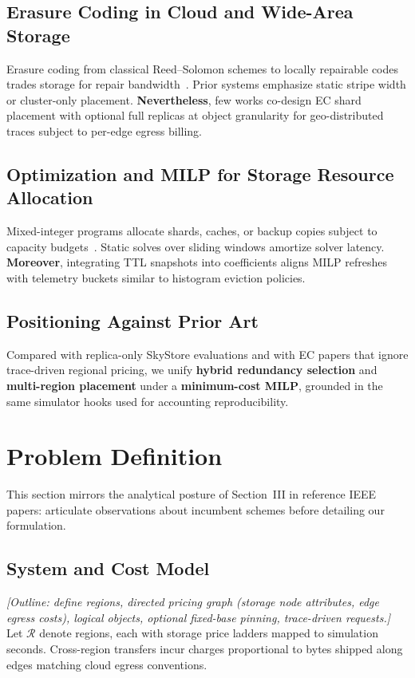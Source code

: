 \documentclass[conference]{IEEEtran}
\begin{document}
\subsection{Erasure Coding in Cloud and Wide-Area Storage}
Erasure coding from classical Reed--Solomon schemes to locally repairable codes trades storage for repair bandwidth~\cite{milp_survey_storage}.
Prior systems emphasize static stripe width or cluster-only placement.
\textbf{Nevertheless}, few works co-design EC shard placement with optional full replicas at object granularity for geo-distributed traces subject to per-edge egress billing.

\subsection{Optimization and MILP for Storage Resource Allocation}
Mixed-integer programs allocate shards, caches, or backup copies subject to capacity budgets~\cite{milp_survey_storage}.
Static solves over sliding windows amortize solver latency.
\textbf{Moreover}, integrating TTL snapshots into coefficients aligns MILP refreshes with telemetry buckets similar to histogram eviction policies.

\subsection{Positioning Against Prior Art}
Compared with replica-only SkyStore evaluations and with EC papers that ignore trace-driven regional pricing, we unify \textbf{hybrid redundancy selection} and \textbf{multi-region placement} under a \textbf{minimum-cost MILP}, grounded in the same simulator hooks used for accounting reproducibility.

\section{Problem Definition}
\label{sec:problem}

This section mirrors the analytical posture of Section~III in reference IEEE papers: articulate observations about incumbent schemes before detailing our formulation.

\subsection{System and Cost Model}
\textit{[Outline: define regions, directed pricing graph (storage node attributes, edge egress costs), logical objects, optional fixed-base pinning, trace-driven requests.]}
Let \(\mathcal{R}\) denote regions, each with storage price ladders mapped to simulation seconds.
Cross-region transfers incur charges proportional to bytes shipped along edges matching cloud egress conventions.
\end{document}
